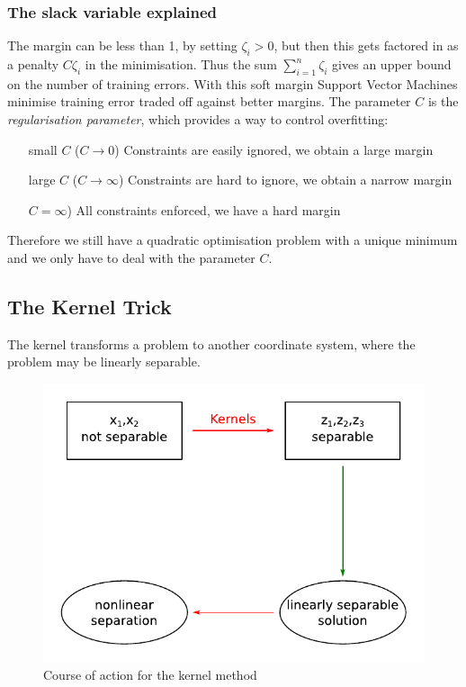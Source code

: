 \documentclass[11pt]{article}
\begin{document}
\subsubsection{The slack variable explained}

The margin can be less than 1, by setting $\zeta_i > 0$, but then this gets factored in as a penalty $C\zeta_i$ in the minimisation. Thus the sum $\sum_{i=1}^{n}\zeta_i$ gives an upper bound on the number of training errors. With this soft margin Support Vector Machines minimise training error traded off against better margins. The parameter $C$ is the \textit{regularisation parameter}, which provides a way to control overfitting:

\begin{itemize}[leftmargin=*, labelindent=5cm, labelsep=0.5cm]
    \item[small $C$ ($C \rightarrow 0$)] Constraints are easily ignored, we obtain a large margin
    \item[large $C$ ($C \rightarrow \infty$)] Constraints are hard to ignore, we obtain a narrow margin
    \item[$C = \infty$)] All constraints enforced, we have a hard margin
\end{itemize}

Therefore we still have a quadratic optimisation problem with a unique minimum and we only have to deal with the parameter $C$.

\subsection{The Kernel Trick}

The kernel transforms a problem to another coordinate system, where the problem may be linearly separable.

\begin{figure}[htb!]
    \centering
    \includegraphics[keepaspectratio, width=0.5\linewidth]{Pictures/KernelTrick.pdf}
    \caption{Course of action for the kernel method}
    \label{fig:kerneltrick}
\end{figure}
\end{document}
